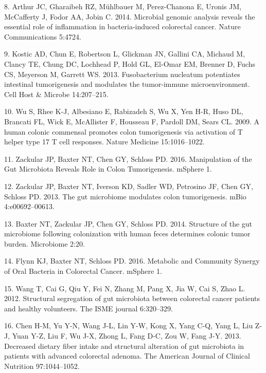 \documentclass[12pt,]{article}
\begin{document}
\hypertarget{ref-arthur_microbial_2014}{}
8. Arthur JC, Gharaibeh RZ, Mühlbauer M, Perez-Chanona E, Uronis JM,
McCafferty J, Fodor AA, Jobin C. 2014. Microbial genomic analysis
reveals the essential role of inflammation in bacteria-induced
colorectal cancer. Nature Communications 5:4724.

\hypertarget{ref-kostic_fusobacterium_2013}{}
9. Kostic AD, Chun E, Robertson L, Glickman JN, Gallini CA, Michaud M,
Clancy TE, Chung DC, Lochhead P, Hold GL, El-Omar EM, Brenner D, Fuchs
CS, Meyerson M, Garrett WS. 2013. Fusobacterium nucleatum potentiates
intestinal tumorigenesis and modulates the tumor-immune
microenvironment. Cell Host \& Microbe 14:207--215.

\hypertarget{ref-wu_human_2009}{}
10. Wu S, Rhee K-J, Albesiano E, Rabizadeh S, Wu X, Yen H-R, Huso DL,
Brancati FL, Wick E, McAllister F, Housseau F, Pardoll DM, Sears CL.
2009. A human colonic commensal promotes colon tumorigenesis via
activation of T helper type 17 T cell responses. Nature Medicine
15:1016--1022.

\hypertarget{ref-zackular_manipulation_2016}{}
11. Zackular JP, Baxter NT, Chen GY, Schloss PD. 2016. Manipulation of
the Gut Microbiota Reveals Role in Colon Tumorigenesis. mSphere 1.

\hypertarget{ref-zackular_gut_2013}{}
12. Zackular JP, Baxter NT, Iverson KD, Sadler WD, Petrosino JF, Chen
GY, Schloss PD. 2013. The gut microbiome modulates colon tumorigenesis.
mBio 4:e00692--00613.

\hypertarget{ref-baxter_structure_2014}{}
13. Baxter NT, Zackular JP, Chen GY, Schloss PD. 2014. Structure of the
gut microbiome following colonization with human feces determines
colonic tumor burden. Microbiome 2:20.

\hypertarget{ref-flynn_metabolic_2016}{}
14. Flynn KJ, Baxter NT, Schloss PD. 2016. Metabolic and Community
Synergy of Oral Bacteria in Colorectal Cancer. mSphere 1.

\hypertarget{ref-wang_structural_2012}{}
15. Wang T, Cai G, Qiu Y, Fei N, Zhang M, Pang X, Jia W, Cai S, Zhao L.
2012. Structural segregation of gut microbiota between colorectal cancer
patients and healthy volunteers. The ISME journal 6:320--329.

\hypertarget{ref-chen_decreased_2013}{}
16. Chen H-M, Yu Y-N, Wang J-L, Lin Y-W, Kong X, Yang C-Q, Yang L, Liu
Z-J, Yuan Y-Z, Liu F, Wu J-X, Zhong L, Fang D-C, Zou W, Fang J-Y. 2013.
Decreased dietary fiber intake and structural alteration of gut
microbiota in patients with advanced colorectal adenoma. The American
Journal of Clinical Nutrition 97:1044--1052.
\end{document}
